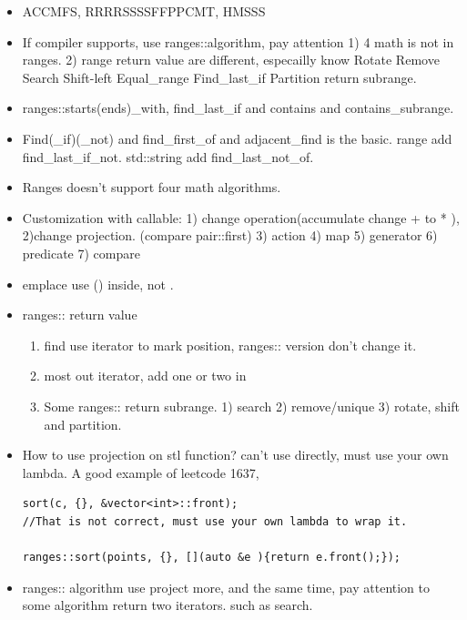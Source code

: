 \documentclass[a4paper,11pt,twoside]{book}
\begin{document}
\begin{itemize}
	\item ACCMFS, RRRRSSSSFFPPCMT, HMSSS
	
	\item If compiler supports, use ranges::algorithm, pay attention 1) 4 math is not in ranges. 2) range return value are different, especailly know Rotate Remove Search Shift-left Equal\_range Find\_last\_if Partition return subrange.
	
	\item ranges::starts(ends)\_with, find\_last\_if and contains and contains\_subrange.
	
	\item Find(\_if)(\_not) and find\_first\_of and adjacent\_find is the basic. range add find\_last\_if\_not. std::string add find\_last\_not\_of. 
	
	\item Ranges doesn't support four math algorithms. 
	
	\item Customization with callable: 1) change operation(accumulate change + to * ), 2)change projection. (compare pair::first)  3) action 4) map 5) generator 6) predicate 7) compare 
	
	\item emplace use () inside, not {}. 
	
	\item ranges:: return value
	\begin{enumerate}
		\item find use iterator to mark position, ranges:: version don't change it. 
		
		\item most out iterator, add one or two in
		
		\item Some ranges:: return subrange. 1) search 2) remove/unique 3) rotate, shift and partition. 
	\end{enumerate}
	
	\item How to use projection on stl function? can't use directly, must use your own lambda. A good example of leetcode 1637,
\begin{lstlisting}
sort(c, {}, &vector<int>::front);
//That is not correct, must use your own lambda to wrap it. 

ranges::sort(points, {}, [](auto &e ){return e.front();});		
\end{lstlisting}		
	
	
	\item ranges:: algorithm use project more, and the same time, pay attention to some algorithm return two iterators. such as search.
\end{itemize}
\end{document}
